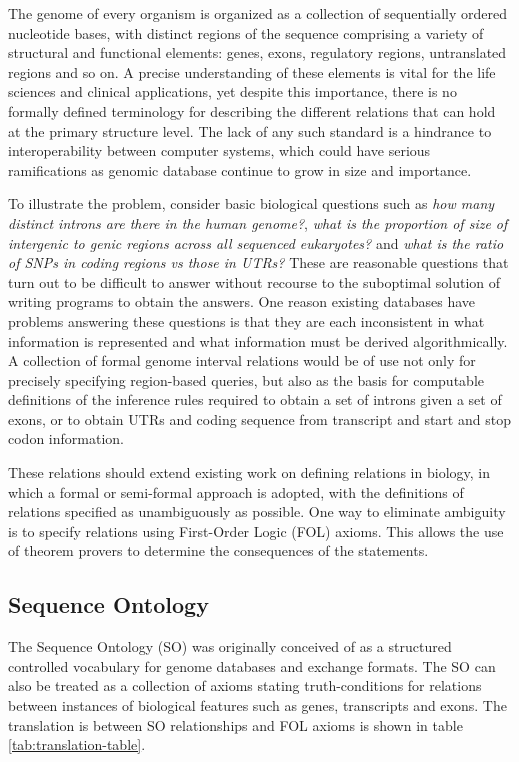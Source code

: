 \documentclass{article}
\begin{document}
The genome of every organism is organized as a collection of
sequentially ordered nucleotide bases, with distinct regions of the
sequence comprising a variety of structural and functional elements:
genes, exons, regulatory regions, untranslated regions and so on. A
precise understanding of these elements is vital for the life sciences
and clinical applications, yet despite this importance, there is no
formally defined terminology for describing the different relations
that can hold at the primary structure level. The lack of any such
standard is a hindrance to interoperability between computer systems,
which could have serious ramifications as genomic database continue to
grow in size and importance.

To illustrate the problem, consider basic biological questions such as
\emph{how many distinct introns are there in the human genome?},
\emph{what is the proportion of size of intergenic to genic regions
  across all sequenced eukaryotes?} and \emph{what is the ratio of
  SNPs in coding regions vs those in UTRs?} These are reasonable
questions that turn out to be difficult to answer without recourse to
the suboptimal solution of writing programs to obtain the answers. One
reason existing databases have problems answering these questions is
that they are each inconsistent in what information is represented and
what information must be derived algorithmically. A collection of
formal genome interval relations would be of use not only for
precisely specifying region-based queries, but also as the basis for
computable definitions of the inference rules required to obtain a set
of introns given a set of exons, or to obtain UTRs and coding sequence
from transcript and start and stop codon information.

These relations should extend existing work on defining relations in
biology\cite{Smith2005}, in which a formal or semi-formal approach is
adopted, with the definitions of relations specified as unambiguously
as possible. One way to eliminate ambiguity is to specify relations
using First-Order Logic (FOL) axioms. This allows the use of theorem
provers to determine the consequences of the statements.

\subsection{Sequence Ontology}

The Sequence Ontology (SO)\cite{Eilbeck2005} was originally conceived
of as a structured controlled vocabulary for genome databases and
exchange formats. The SO can also be treated as a collection of axioms
stating truth-conditions for relations between instances of biological
features such as genes, transcripts and exons. The translation is
between SO relationships and FOL axioms is shown in table
\ref{tab:translation-table}.
\end{document}
